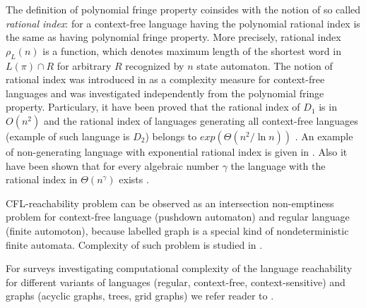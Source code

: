 \documentclass[smallextended]{svjour3}       %
\begin{document}
The definition of polynomial fringe property coinsides with the notion of so called \textit{rational index}: for a context-free language having the polynomial rational index is the same as having polynomial fringe property. More precisely, rational index $\rho_L(n)$ is a function, which denotes maximum length of the shortest word in $L(\pi) \cap R$ for arbitrary $R$ recognized by $n$ state automaton. The notion of rational index was introduced in \cite{RatBasic} as a complexity measure for context-free languages and was investigated independently from the polynomial fringe property.  Particulary, it have been proved that the rational index of $D_1$ is in $O( n^2)$ \cite{Dyck1} and the rational index of languages generating all context-free languages (example of such language is $D_2$) belongs to $exp(\Theta(n^2/\ln n))$ \cite{CFRat}. An example of non-generating language with exponential rational index is given in \cite{Regularrealizability}. Also it have been shown that for every algebraic number $\gamma $ the language with the rational index in $\Theta (n^\gamma )$ exists \cite{GreibRat}. 


CFL-reachability problem can be observed as an intersection non-emptiness problem for context-free language (pushdown automaton) and regular language (finite automoton), because labelled graph is a special kind of nondeterministic finite automata. Complexity of such problem is studied in \cite*{ ganardi2016circuit, Intersection, VyalyiRR}.


For surveys investigating computational complexity of the language reachability for different variants of languages (regular, context-free, context-sensitive) and graphs (acyclic graphs, trees, grid graphs) we refer reader to \cite*{Barrett, LabelledGraphs, LReach}. 
\end{document}
